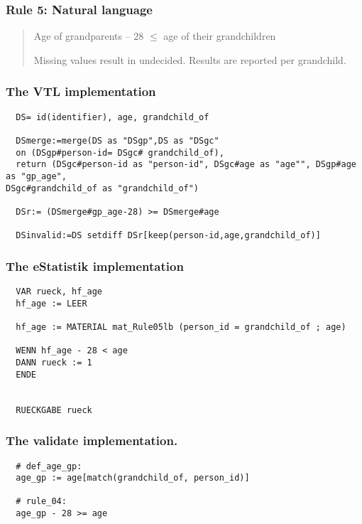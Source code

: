 \newpage

\subsubsection*{  Rule 5: Natural language}
\begin{quote}


Age of grandparents $–$ $28$ $\leq$ age of their grandchildren

Missing values result in undecided. Results are reported per grandchild.



\end{quote}
\subsubsection*{The VTL implementation}
\begin{verbatim}
  DS= id(identifier), age, grandchild_of

  DSmerge:=merge(DS as "DSgp",DS as "DSgc"
  on (DSgp#person-id= DSgc# grandchild_of),
  return (DSgc#person-id as "person-id", DSgc#age as "age"", DSgp#age as "gp_age",
DSgc#grandchild_of as "grandchild_of")

  DSr:= (DSmerge#gp_age-28) >= DSmerge#age

  DSinvalid:=DS setdiff DSr[keep(person-id,age,grandchild_of)]

\end{verbatim}
\subsubsection*{The eStatistik implementation}
\begin{verbatim}
  VAR rueck, hf_age
  hf_age := LEER

  hf_age := MATERIAL mat_Rule05lb (person_id = grandchild_of ; age)

  WENN hf_age - 28 < age
  DANN rueck := 1
  ENDE


  RUECKGABE rueck
\end{verbatim}
\subsubsection*{The validate implementation.}
\begin{verbatim}
  # def_age_gp:
  age_gp := age[match(grandchild_of, person_id)]

  # rule_04:
  age_gp - 28 >= age
\end{verbatim}


